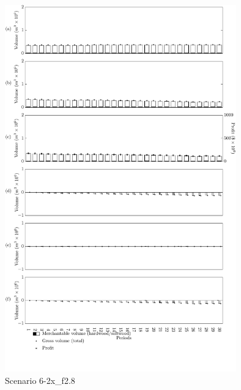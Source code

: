 \begin{figure}[h]
  \centering
  \includegraphics[width=10cm]{images/appendix/s6-2x_test30}
  \caption{Scenario 6-2x\_f2.8}
  \label{fig:s6-2x_test30}
\end{figure}

